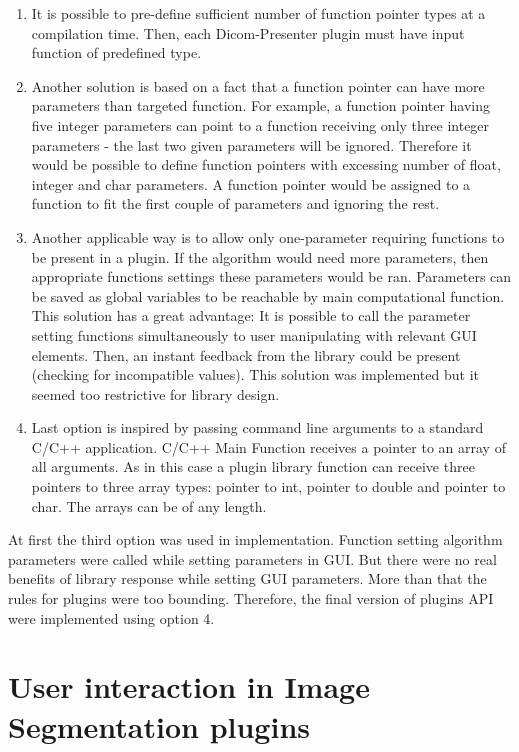 \begin{enumerate}
\item It is possible to pre-define sufficient number of function pointer types at a compilation time. Then, each Dicom-Presenter plugin must have input function of predefined type.
\item Another solution is based on a fact that a function pointer can have more parameters than targeted function. For example, a function pointer having five integer parameters can point to a function receiving only three integer parameters - the last two given parameters will be ignored. Therefore it would be possible to define function pointers with excessing number of float, integer and char parameters. A function pointer would be assigned to a function to fit the first couple of parameters and ignoring the rest.
\item Another applicable way is to allow only one-parameter requiring functions to be present in a plugin. If the algorithm would need more parameters, then appropriate functions settings these parameters would be ran. Parameters can be saved as global variables to be reachable by main computational function. This solution has a great advantage: It is possible to call the parameter setting functions simultaneously to user  manipulating with relevant GUI elements. Then, an instant feedback from the library could be present (checking for incompatible values). This solution was implemented but it seemed too restrictive for library design. 
\item Last option is inspired by passing command line arguments to a standard C/C++ application. C/C++ Main Function receives a pointer to an array of all arguments. As in this case a plugin library function can receive three pointers to three array types: pointer to int, pointer to double and pointer to char. The arrays can be of any length.
\end{enumerate}

At first the third option was used in implementation. Function setting algorithm parameters were called while setting parameters in GUI. But there were no real benefits of library response while setting GUI parameters. More than that the rules for plugins were too bounding. Therefore, the final version of plugins API were implemented using option 4.

\section{User interaction in Image Segmentation plugins}

